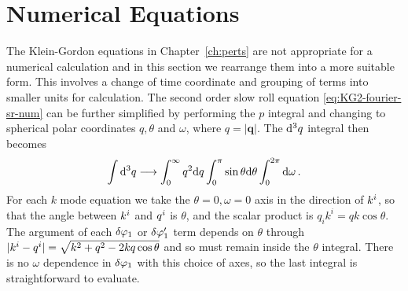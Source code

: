 \section{Numerical Equations}
\label{sec:eqs-num}

The Klein-Gordon equations in Chapter~\ref{ch:perts} are not appropriate for a
numerical calculation and in this section we rearrange them into a more
suitable form. This involves a change of time coordinate and grouping of terms
into smaller units for calculation.
The second order slow roll equation \eqref{eq:KG2-fourier-sr-num} can be further
simplified by performing the $p$
integral and changing to spherical polar coordinates $q, \theta$ and $\omega$, where
$q=|\textbf{q}|$. The $\mathrm{d}^3q$ integral then becomes
% 
\begin{equation}
 \int \mathrm{d}^3q \longrightarrow \int_{0}^{\infty} q^2 \mathrm{d} q \int_{0}^{\pi}\sin \theta
\mathrm{d}\theta 
   \int_{0}^{2\pi}\mathrm{d}\omega \,.
\end{equation}
% 
For each $k$ mode equation we take the $\theta=0, \omega=0$ axis in the
direction of $k^i$, so that the angle between $k^i$ and $q^i$ is
$\theta$, and the scalar product is $q_i k^i = q k \cos\theta$. 
The argument of
each $\delta\varphi_{1}$ or $\delta\varphi_{1}'$ term depends on $\theta$ through
$|k^i-q^i|=\sqrt{k^2 + q^2 -2kq \cos\theta}$ and
so must remain inside the $\theta$ integral. There is no $\omega$ dependence
in $\delta\varphi_{1}$ with this choice of axes, so the last integral is straightforward
to evaluate.

